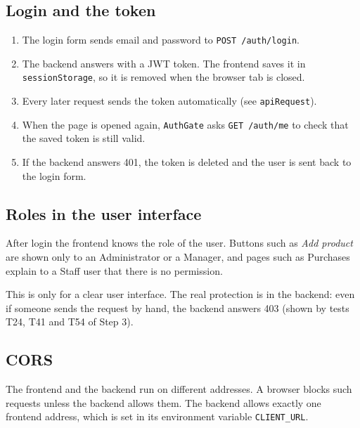 \documentclass[11pt,a4paper]{article}
\newcommand{\code}[1]{\texttt{#1}}
\begin{document}
\subsection{Login and the token}
\begin{enumerate}
  \item The login form sends email and password to \code{POST /auth/login}.
  \item The backend answers with a JWT token. The frontend saves it in \code{sessionStorage}, so it is removed when the browser tab is closed.
  \item Every later request sends the token automatically (see \code{apiRequest}).
  \item When the page is opened again, \code{AuthGate} asks \code{GET /auth/me} to check that the saved token is still valid.
  \item If the backend answers 401, the token is deleted and the user is sent back to the login form.
\end{enumerate}

\subsection{Roles in the user interface}
After login the frontend knows the role of the user. Buttons such as \emph{Add product} are shown only to an Administrator or a Manager, and pages such as Purchases explain to a Staff user that there is no permission.

This is only for a clear user interface. The real protection is in the backend: even if someone sends the request by hand, the backend answers 403 (shown by tests T24, T41 and T54 of Step 3).

\subsection{CORS}
The frontend and the backend run on different addresses. A browser blocks such requests unless the backend allows them. The backend allows exactly one frontend address, which is set in its environment variable \code{CLIENT\_URL}.
\end{document}
